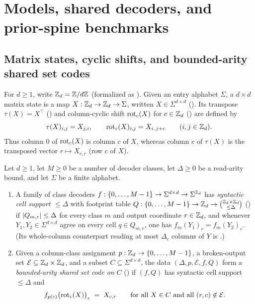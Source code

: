 \section{Models, shared decoders, and prior-spine benchmarks}\label{sec:model}

\subsection{Matrix states, cyclic shifts, and bounded-arity shared set codes}\label{sec:defs-shared}

For $d \ge 1$, write $\mathbb{Z}_d = \mathbb{Z}/d\mathbb{Z}$ (formalized as ). Given an entry alphabet
$\Sigma$, a $d \times d$ matrix state is a map $X : \mathbb{Z}_d \to \mathbb{Z}_d \to \Sigma$, written
$X \in \Sigma^{d\times d}$ (). Its transpose $\tau(X) = X^\top$
() and column-cyclic shift $\operatorname{rot}_c(X)$ for $c \in \mathbb{Z}_d$
() are defined by
\[
  \tau(X)_{i,j} = X_{j,i},
  \qquad
  \operatorname{rot}_c(X)_{i,j} = X_{i,\,j+c}
  \qquad (i, j \in \mathbb{Z}_d).
\]
Thus column $0$ of $\operatorname{rot}_c(X)$ is column $c$ of $X$, whereas column $c$ of $\tau(X)$ is the
transposed vector $r \mapsto X_{c,r}$ (row $c$ of $X$).

\begin{definition}\label{def:bounded-arity-set-code}
Let $d \ge 1$, let $M \ge 0$ be a number of decoder classes, let $\Delta \ge 0$ be a read-arity
bound, and let $\Sigma$ be a finite alphabet.
\begin{enumerate}[label=(\alph*)]
\item A family of class decoders $f : \{0,\dots,M-1\} \to \Sigma^{d\times d} \to \Sigma^{\mathbb{Z}_d}$ has
  \emph{syntactic cell support $\le \Delta$} with footprint table
  $Q : \{0,\dots,M-1\} \to \mathbb{Z}_d \to \binom{\mathbb{Z}_d \times \mathbb{Z}_d}{\le \Delta}$
  () if $\lvert Q_{m,r} \rvert \le \Delta$ for every class $m$ and output
  coordinate $r \in \mathbb{Z}_d$, and whenever $Y_1, Y_2 \in \Sigma^{d\times d}$ agree on every cell
  $q \in Q_{m,r}$, one has $f_m(Y_1)_r = f_m(Y_2)_r$. (Its whole-column counterpart reading at
  most $\Delta_c$ columns of $Y$ is .)
\item Given a column-class assignment $p : \mathbb{Z}_d \to \{0,\dots,M-1\}$, a broken-output set
  $\mathcal{E} \subseteq \mathbb{Z}_d \times \mathbb{Z}_d$, and a subset $C \subseteq \Sigma^{d\times d}$, the data
  $(\Delta, p, \mathcal{E}, f, Q)$ form a \emph{bounded-arity shared set code on $C$}
  () if $(f, Q)$ has syntactic cell support $\le \Delta$ and
  \[
    f_{p(c)}\bigl(\operatorname{rot}_c(X)\bigr)_r \;=\; X_{c,r}
    \qquad
    \text{for all } X \in C \text{ and all } (r,c) \notin \mathcal{E}.
  \]
\end{enumerate}
\end{definition}

